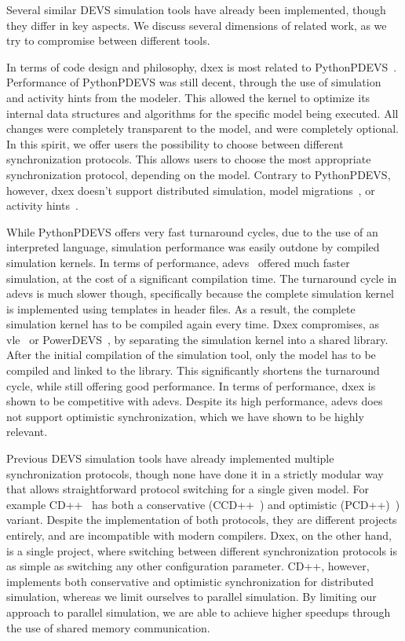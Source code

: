 Several similar \textsf{DEVS} simulation tools have already been implemented, though they differ in key aspects.
We discuss several dimensions of related work, as we try to compromise between different tools.

In terms of code design and philosophy, dxex is most related to PythonPDEVS~\cite{PythonPDEVS}.
Performance of PythonPDEVS was still decent, through the use of simulation and activity hints from the modeler.
This allowed the kernel to optimize its internal data structures and algorithms for the specific model being executed.
All changes were completely transparent to the model, and were completely optional.
In this spirit, we offer users the possibility to choose between different synchronization protocols.
This allows users to choose the most appropriate synchronization protocol, depending on the model.
Contrary to PythonPDEVS, however, dxex doesn't support distributed simulation, model migrations~\cite{PythonPDEVS2}, or activity hints~\cite{PythonPDEVS_ACTIMS}.

While PythonPDEVS offers very fast turnaround cycles, due to the use of an interpreted language, simulation performance was easily outdone by compiled simulation kernels.
In terms of performance, adevs~\cite{adevs} offered much faster simulation, at the cost of a significant compilation time.
The turnaround cycle in adevs is much slower though, specifically because the complete simulation kernel is implemented using templates in header files.
As a result, the complete simulation kernel has to be compiled again every time.
Dxex compromises, as vle~\cite{vle} or PowerDEVS~\cite{PowerDEVS}, by separating the simulation kernel into a shared library.
After the initial compilation of the simulation tool, only the model has to be compiled and linked to the library.
This significantly shortens the turnaround cycle, while still offering good performance.
In terms of performance, dxex is shown to be competitive with adevs.
Despite its high performance, adevs does not support optimistic synchronization, which we have shown to be highly relevant.

Previous \textsf{DEVS} simulation tools have already implemented multiple synchronization protocols, though none have done it in a strictly modular way that allows straightforward protocol switching for a single given model.
For example CD++~\cite{CD++} has both a conservative (CCD++~\cite{CCD++}) and optimistic (PCD++)~\cite{PCD++}) variant.
Despite the implementation of both protocols, they are different projects entirely, and are incompatible with modern compilers.
Dxex, on the other hand, is a single project, where switching between different synchronization protocols is as simple as switching any other configuration parameter.
CD++, however, implements both conservative and optimistic synchronization for distributed simulation, whereas we limit ourselves to parallel simulation.
By limiting our approach to parallel simulation, we are able to achieve higher speedups through the use of shared memory communication.


